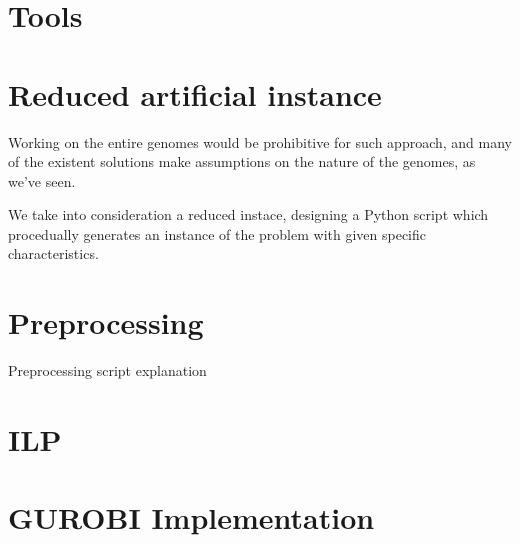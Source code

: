 \section{Tools}
\section{Reduced artificial instance}
Working on the entire genomes would be prohibitive for such approach, and many of the existent solutions make assumptions on the nature of the genomes, as we've seen.

We take into consideration a reduced instace, designing a Python script which procedually generates an instance of the problem with given specific characteristics.

\section{Preprocessing}
Preprocessing script explanation
\section{ILP}

\section{GUROBI Implementation}